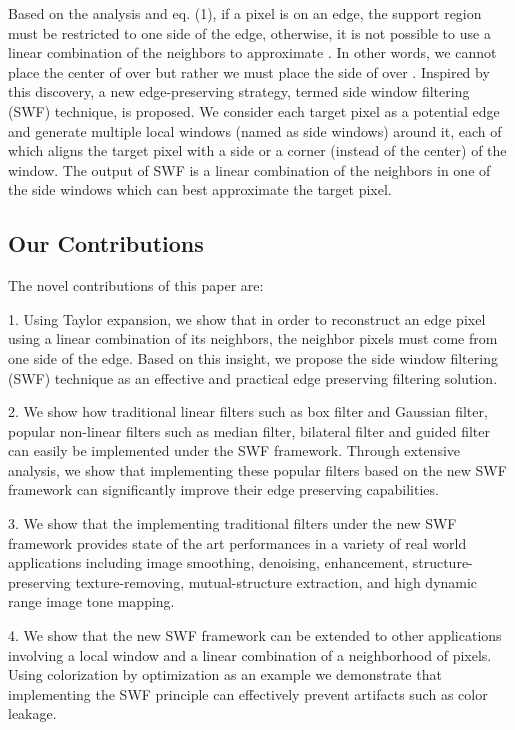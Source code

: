 \documentclass[10pt,twocolumn,letterpaper]{article}
\begin{document}
Based on the analysis and eq. (1), if a pixel  is on an edge, the support region  must be restricted to one side of the edge, otherwise, it is not possible to use a linear combination of the neighbors to approximate . In other words, we cannot place the center of  over  but rather we must place the side of  over . Inspired by this discovery, a new edge-preserving strategy, termed side window filtering (SWF) technique, is proposed. We consider each target pixel as a potential edge and generate multiple local windows (named as side windows) around it, each of which aligns the target pixel with a side or a corner (instead of the center) of the window. The output of SWF is a linear combination of the neighbors in one of the side windows which can best approximate the target pixel. 

\subsection{Our Contributions}
The novel contributions of this paper are:

1. Using Taylor expansion, we show that in order to reconstruct an edge pixel using a linear combination of its neighbors, the neighbor pixels must come from one side of the edge. Based on this insight, we propose the side window filtering (SWF) technique as an effective and practical edge preserving filtering solution. 

2. We show how traditional linear filters such as box filter and Gaussian filter, popular non-linear filters such as median filter, bilateral filter and  guided filter can easily be implemented under the SWF framework. Through extensive analysis, we show that implementing these popular filters based on the new SWF framework can significantly improve their edge preserving capabilities.

3. We show that the implementing traditional filters under the new SWF framework provides state of the art performances in a variety of real world applications including image smoothing, denoising, enhancement,  structure-preserving texture-removing, mutual-structure extraction, and high dynamic range image tone mapping.

4. We show that the new SWF framework can be extended to other applications involving a local window and a linear combination of a neighborhood of pixels. Using colorization by optimization as an example we demonstrate that implementing the SWF principle can effectively prevent artifacts such as color leakage.
\end{document}
